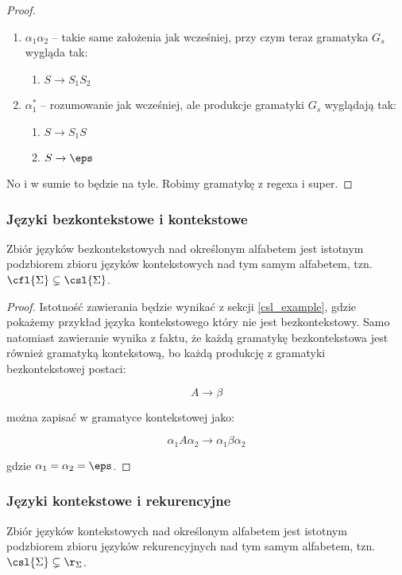 \begin{proof}
\begin{enumerate}
        \item \( \alpha_1 \alpha_2\) -- takie same założenia jak wcześniej, przy czym teraz gramatyka \(G_s\) wygląda tak:
        
        \begin{enumerate}
            \item \(S \rightarrow S_1S_2\)
        \end{enumerate}
        
        \item \( \alpha_1^*\) -- rozumowanie jak wcześniej, ale produkcje gramatyki \(G_s\) wyglądają tak:
        
        \begin{enumerate}
            \item \( S \rightarrow S_1S\)
            \item \( S \rightarrow \eps \)
        \end{enumerate}
    \end{enumerate}
    No i w sumie to będzie na tyle. Robimy gramatykę z regexa i super. 
\end{proof}

\subsubsection{Języki bezkontekstowe i kontekstowe}

\begin{theorem}
Zbiór języków bezkontekstowych nad określonym alfabetem jest istotnym podzbiorem zbioru języków kontekstowych nad tym samym alfabetem, tzn. \(\cfl{\Sigma} \subsetneq \csl{\Sigma}\).
\end{theorem}

\begin{proof}
Istotność zawierania będzie wynikać z sekcji \ref{csl_example}, gdzie pokażemy przykład języka kontekstowego który nie jest bezkontekstowy. Samo natomiast zawieranie wynika z faktu, że każdą gramatykę bezkontekstowa jest również gramatyką kontekstową, bo każdą produkcję z gramatyki bezkontekstowej postaci: 

\[
    A \rightarrow \beta 
\]

można zapisać w gramatyce kontekstowej jako:

\[ 
  \alpha_1 A \alpha_2 \rightarrow \alpha_1 \beta \alpha_2
\]

gdzie \(\alpha_1 = \alpha_2 = \eps\). 
\end{proof}

\subsubsection{Języki kontekstowe i rekurencyjne}
\begin{theorem}
Zbiór języków kontekstowych nad określonym alfabetem jest istotnym podzbiorem zbioru języków rekurencyjnych nad tym samym alfabetem, tzn. \(\csl{\Sigma} \subsetneq \r_{\Sigma}\).
\end{theorem}

